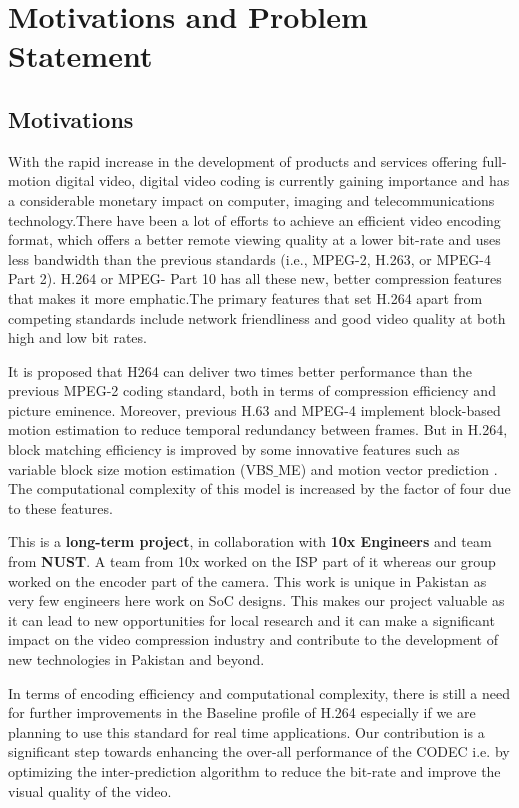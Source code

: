 
\chapter{Motivations and Problem Statement} %
\label{Chapter2}

\section{Motivations}

With the rapid increase in the development of products and services offering full-motion digital video, digital video coding is currently gaining importance and has a considerable monetary impact on computer, imaging and telecommunications technology.There have been a lot of efforts to achieve an efficient video encoding format, which offers a better remote viewing quality at a lower bit-rate and uses less bandwidth than the previous standards (i.e., MPEG-2, H.263, or MPEG-4 Part 2). H.264 or MPEG- Part 10 has all these new, better compression features that makes it more emphatic.The primary features that set H.264 apart from competing standards include network friendliness and good video quality at both high and low bit rates. \cite{amer2005high} 

It is proposed that H264 can deliver two times better performance than the previous MPEG-2 coding standard, both in terms of compression efficiency and picture eminence. Moreover, previous H.63 and MPEG-4 implement block-based motion estimation to reduce temporal redundancy between frames. But in H.264, block matching efficiency is improved by some innovative features such as variable block size motion estimation (VBS$\_$ME) and motion vector prediction \cite{li2003serial}. The computational complexity of this model is increased by the factor of four due to these features.

This is a \textbf{long-term project}, in collaboration with \textbf{10x Engineers} and team from \textbf{NUST}. A team from 10x worked on the ISP part of it whereas our group worked on the encoder part of the camera. This work is unique in Pakistan as very few engineers here work on SoC designs. This makes our project valuable as it can lead to new opportunities for local research and it can make a significant impact on the video compression industry and contribute to the development of new technologies in Pakistan and beyond.

In terms of encoding efficiency and computational complexity, there is still a need for further improvements in the Baseline profile of H.264 especially if we are planning to use this standard for real time applications. Our contribution is a significant step towards enhancing the over-all performance of the CODEC i.e. by optimizing the inter-prediction algorithm to reduce the bit-rate and improve the visual quality of the video. 


